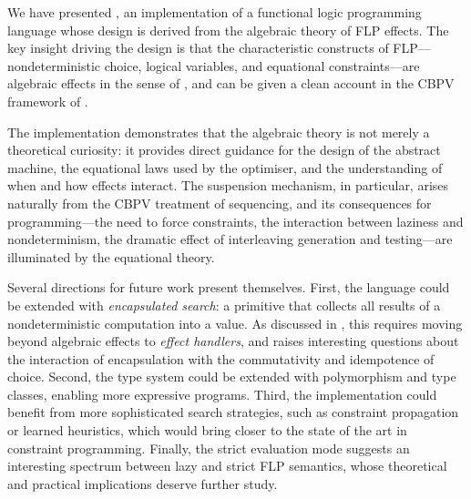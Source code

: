 We have presented \Gweek{}, an implementation of a functional logic programming
language whose design is derived from the algebraic theory of FLP effects. The
key insight driving the design is that the characteristic constructs of
FLP---nondeterministic choice, logical variables, and equational
constraints---are algebraic effects in the sense of \textcite{plotkin_2003}, and
can be given a clean account in the CBPV framework of \textcite{levy_2003}.

The implementation demonstrates that the algebraic theory is not merely a
theoretical curiosity: it provides direct guidance for the design of the
abstract machine, the equational laws used by the optimiser, and the
understanding of when and how effects interact. The suspension mechanism, in
particular, arises naturally from the CBPV treatment of sequencing, and its
consequences for programming---the need to force constraints, the interaction
between laziness and nondeterminism, the dramatic effect of interleaving
generation and testing---are illuminated by the equational theory.

Several directions for future work present themselves. First, the language could
be extended with \emph{encapsulated search}: a primitive that collects all
results of a nondeterministic computation into a value. As discussed in
\parencite{jones_2026}, this requires moving beyond algebraic effects to
\emph{effect handlers}, and raises interesting questions about the interaction of
encapsulation with the commutativity and idempotence of choice. Second, the type
system could be extended with polymorphism and type classes, enabling more
expressive programs. Third, the implementation could benefit from more
sophisticated search strategies, such as constraint propagation or learned
heuristics, which would bring \Gweek{} closer to the state of the art in
constraint programming. Finally, the strict evaluation mode suggests an
interesting spectrum between lazy and strict FLP semantics, whose theoretical
and practical implications deserve further study.
